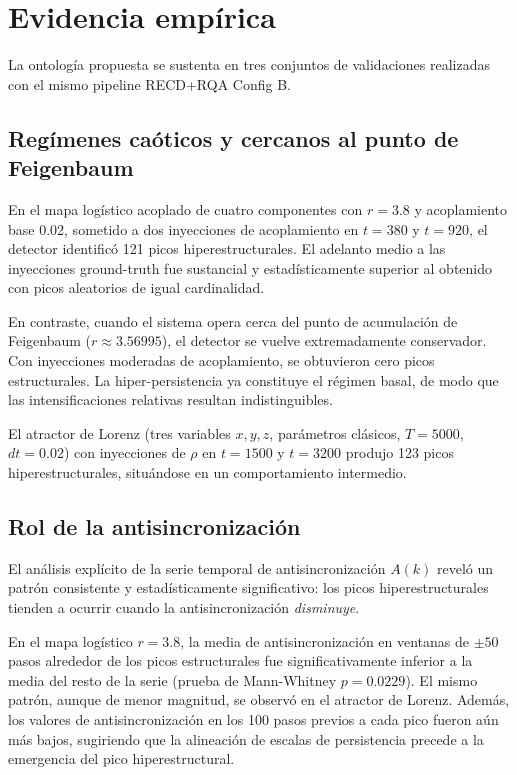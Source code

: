 \section{Evidencia empírica}

La ontología propuesta se sustenta en tres conjuntos de validaciones realizadas con el mismo pipeline RECD+RQA Config B.

\subsection{Regímenes caóticos y cercanos al punto de Feigenbaum}

En el mapa logístico acoplado de cuatro componentes con $r=3.8$ y acoplamiento base 0.02, sometido a dos inyecciones de acoplamiento en $t=380$ y $t=920$, el detector identificó 121 picos hiperestructurales. El adelanto medio a las inyecciones ground-truth fue sustancial y estadísticamente superior al obtenido con picos aleatorios de igual cardinalidad.

En contraste, cuando el sistema opera cerca del punto de acumulación de Feigenbaum ($r \approx 3.56995$), el detector se vuelve extremadamente conservador. Con inyecciones moderadas de acoplamiento, se obtuvieron cero picos estructurales. La hiper-persistencia ya constituye el régimen basal, de modo que las intensificaciones relativas resultan indistinguibles.

El atractor de Lorenz (tres variables $x,y,z$, parámetros clásicos, $T=5000$, $dt=0.02$) con inyecciones de $\rho$ en $t=1500$ y $t=3200$ produjo 123 picos hiperestructurales, situándose en un comportamiento intermedio.

\subsection{Rol de la antisincronización}

El análisis explícito de la serie temporal de antisincronización $A(k)$ reveló un patrón consistente y estadísticamente significativo: los picos hiperestructurales tienden a ocurrir cuando la antisincronización \textit{disminuye}.

En el mapa logístico $r=3.8$, la media de antisincronización en ventanas de $\pm 50$ pasos alrededor de los picos estructurales fue significativamente inferior a la media del resto de la serie (prueba de Mann-Whitney $p=0.0229$). El mismo patrón, aunque de menor magnitud, se observó en el atractor de Lorenz. Además, los valores de antisincronización en los 100 pasos previos a cada pico fueron aún más bajos, sugiriendo que la alineación de escalas de persistencia precede a la emergencia del pico hiperestructural.

